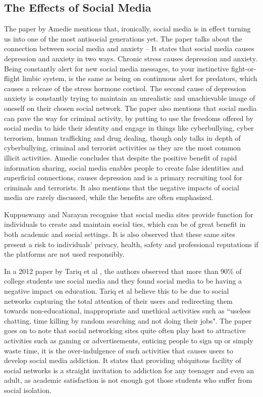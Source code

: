 \documentclass[lettersize,journal]{IEEEtran}
\begin{document}
\subsection{The Effects of Social Media}
    The paper by Amedie \cite{Amedie 2015} mentions that, ironically, social
    media is in effect turning us into one of the most antisocial generations
    yet. The paper talks about the connection between social media and anxiety
    – It states that social media causes depression and anxiety in two ways. Chronic
    stress causes depression and anxiety. Being constantly alert for new social
    media messages, to your instinctive fight-or-flight limbic system, is the
    same as being on continuous alert for predators, which causes a release of
    the stress hormone cortisol. The second cause of depression anxiety is
    constantly trying to maintain an unrealistic and unachievable image of
    oneself on their chosen social network. The paper also mentions
    that social media can pave the way for criminal activity, by putting to use
    the freedoms offered by social media to hide their identity and engage in
    things like cyberbullying, cyber terrorism, human trafficking and drug dealing,
    though only talks in depth of cyberbullying, criminal and terrorist activities
    as they are the most common illicit activities. Amedie concludes that despite
    the positive benefit of rapid information sharing, social media enables people
    to create false identities and superficial connections, causes depression and
    is a primary recruiting tool for criminals and terrorists. It also mentions
    that the negative impacts of social media are rarely discussed, while the benefits
    are often emphasized.

    Kuppuswamy and Narayan \cite{Kuppuswamy et al 2010} recognise that social
    media sites provide function for individuals to create and maintain social
    ties, which can be of great benefit in both academic and social settings.
    It is also observed that these same sites present a risk to individuals'
    privacy, health, safety and professional reputations if the platforms are
    not used responsibly.

    In a 2012 paper by Tariq et al \cite{Tariq et al 2012}, the authors observed that more than 90\%
    of college students use social media \cite{Ellison et al 2007} and they found social media to be
    having a negative impact on education. Tariq et al believe this to be due to social networks
    capturing the total attention of their users and redirecting them towards non-educational, inappropriate
    and unethical activities such as ``useless chatting, time killing by random searching and not doing their jobs". The paper
    goes on to note that social networking sites quite often play host to attractive activities such
    as gaming or advertisements, enticing people to sign up or simply waste time, it is the over-indulgence
    of such activities that causes users to develop social media addiction. It states that providing ubiquitous
    facility of social networks is a straight invitation to addiction for any teenager and even an adult, as
    academic satisfaction is not enough got those students who suffer from social isolation\cite{Pempek et al 2009}.   
\end{document}
